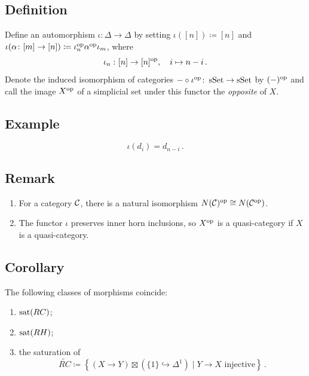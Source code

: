     \subsection{Definition}
        Define an automorphism $\iota \colon \Delta \to \Delta$ by setting $\iota([n]) \coloneq [n]$ and $\iota(\alpha \colon [m] \to [n]) \coloneq \iota^{\operatorname{op}}_n \alpha^{\operatorname{op}} \iota_m$, where
        \begin{equation*}
            \iota_n \,\colon [n] \to [n]^{\operatorname{op}}, \quad i \mapsto n - i \,.
        \end{equation*}
        Denote the induced isomorphism of categories $- \circ \iota^{\operatorname{op}} \colon \operatorname{sSet} \to \operatorname{sSet}$ by $(-)^{\operatorname{op}}$ and call the image $X^{\operatorname{op}}$ of a simplicial set under this functor the \emph{opposite} of $X$.

    \subsection{Example}
        \begin{equation*}
            \iota(d_i) = d_{n-i} \,.
        \end{equation*}

    \subsection{Remark}
        \begin{enumerate}
            \item 
                For a category $\mathcal{C}$, there is a natural isomorphism $N(\mathcal{C})^{\operatorname{op}} \cong N(\mathcal{C}^{\operatorname{op}})$.
            \item 
                The functor $\iota$ preserves inner horn inclusions, so $X^{\operatorname{op}}$ is a quasi-category if $X$ is a quasi-category.
        \end{enumerate}

    \subsection{Corollary}\label{chV-2-14}
        The following classes of morphisms coincide:
        \begin{enumerate}
            \item 
                $\operatorname{sat}(RC)$;
            \item 
                $\operatorname{sat}(RH)$;
            \item 
                the saturation of
                \begin{equation*}
                    \widetilde{RC} \coloneq \left\{ (X \to Y) \boxtimes (\{1\} \hookrightarrow \Delta^1) \mid Y \to X \text{ injective}\right\} \,.
                \end{equation*}
        \end{enumerate}

